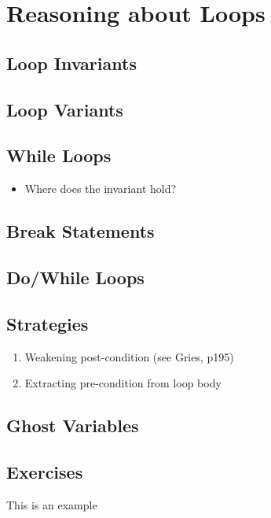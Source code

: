 \chapter{Reasoning about Loops}
\label{c_reasoning_loops}

\section{Loop Invariants}
\section{Loop Variants}
\section{While Loops}
\begin{itemize}
\item Where does the invariant hold?
\end{itemize}
\section{Break Statements}
\section{Do/While Loops}
\section{Strategies}
\begin{enumerate}
\item Weakening post-condition (see Gries, p195)
\item Extracting pre-condition from loop body
\end{enumerate}
\section{Ghost Variables}


\section{Exercises}

\begin{ex}
This is an example
\end{ex}